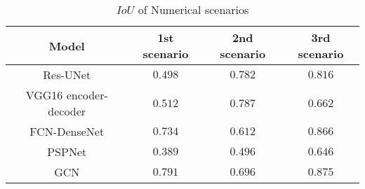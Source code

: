 \begin{table}[]
	\centering
	\caption{\(IoU\) of Numerical scenarios}
	\label{tab:table_numerical_scenarios}
	\resizebox{\textwidth}{!}
	{
		\begin{tabular}{cccc}\hline
			Model & 1st scenario & 2nd scenario & 3rd scenario \\ \hline
			Res-UNet & \(0.498\) & \(0.782\) & \(0.816\)  \\ 
			VGG16 encoder-decoder & \(0.512\) & \(0.787\)  & \(0.662\)  \\
			FCN-DenseNet & \(0.734\)  & \(0.612\)  & \(0.866\)  \\ 
			PSPNet & \(0.389\) & \(0.496\) & \(0.646\)  \\ 
			GCN & \(0.791\) & \(0.696\) & \(0.875\) \\ \hline
		\end{tabular}
	}
\end{table}

